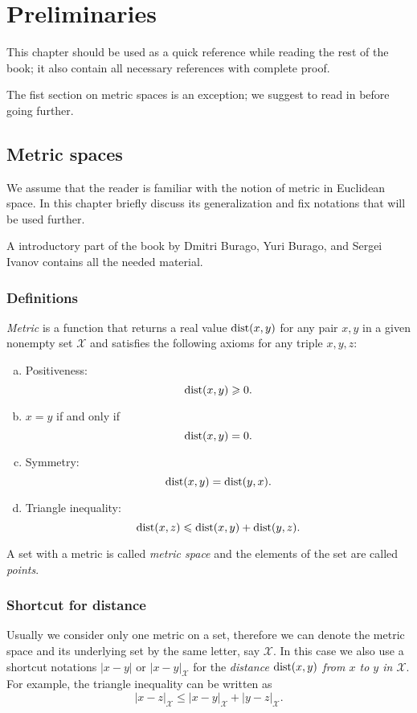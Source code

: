 \addtocounter{chapter}{-1}
\chapter{Preliminaries}

This chapter should be used as a quick reference while reading the rest of the book;
it also contain all necessary references with complete proof.

The fist section on metric spaces is an exception;
we suggest to read in before going further.

\section{Metric spaces}\label{sec:metric-spcaes}

We assume that the reader is familiar with the notion of metric in 
Euclidean space.
In this chapter briefly discuss its generalization and fix notations that will be used further.

A introductory part of the book by Dmitri Burago, Yuri Burago, and Sergei Ivanov \cite{burago-burago-ivanov} contains all the needed material.

\subsection*{Definitions}

\emph{Metric} is a function that returns a real value $\mathop{\rm dist}\nolimits(x,y)$ for any pair $x,y$ in a given nonempty set $\mathcal X$  and satisfies the following axioms for any triple $x,y,z$: \label{page:def:metric}
\begin{enumerate}[(a)]
\item\label{def:metric-space:a} Positiveness: 
$$\mathop{\rm dist}\nolimits(x,y)\geqslant 0.$$
\item\label{def:metric-space:b} $x=y$ if and only if 
$$\mathop{\rm dist}\nolimits(x,y)=0.$$
\item\label{def:metric-space:c} Symmetry: $$\mathop{\rm dist}\nolimits(x, y) = \mathop{\rm dist}\nolimits(y, x).$$
\item\label{def:metric-space:d} Triangle inequality: 
$$\mathop{\rm dist}\nolimits(x, z) \leqslant \mathop{\rm dist}\nolimits(x, y) + \mathop{\rm dist}\nolimits(y, z).$$
\end{enumerate}

A set with a metric is called \emph{metric space} and the elements of the set are called \emph{points}.

\subsection*{Shortcut for distance}
Usually we consider only one metric on a set, therefore we can denote the metric space and its underlying set by the same letter, say $\mathcal X$.
In this case we also use a shortcut notations $|x-y|$ or $|x-y|_{\mathcal X}$  for the {}\emph{distance $\mathop{\rm dist}\nolimits(x,y)$ from $x$ to $y$ in $\mathcal X$}.
For example, the triangle inequality can be written as 
$$|x-z|_{\mathcal X}\le |x-y|_{\mathcal X}+|y-z|_{\mathcal X}.$$

